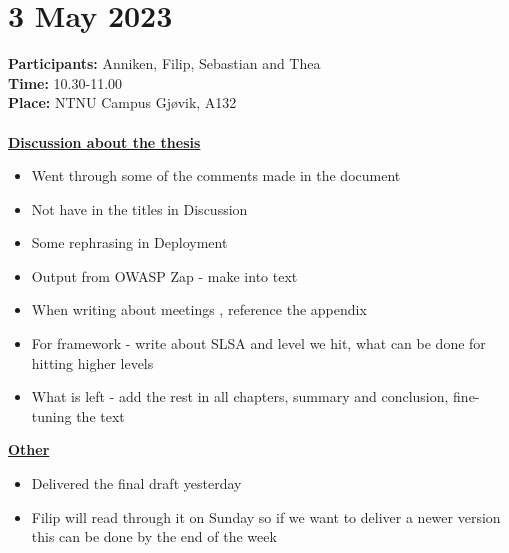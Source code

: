 \section{3 May 2023}
\textbf{Participants:} Anniken, Filip, Sebastian and Thea \\
\textbf{Time:} 10.30-11.00 \\
\textbf{Place:} NTNU Campus Gjøvik, A132
\\~\\
\textbf{\underline{Discussion about the thesis}}
\begin{itemize}
    \item Went through some of the comments made in the document
    \item Not have  in the titles in Discussion
    \item Some rephrasing in Deployment
    \item Output from OWASP Zap - make into text
    \item When writing about meetings , reference the appendix
    \item For framework - write about SLSA and level we hit, what can be done for hitting higher levels
    \item What is left - add the rest in all chapters, summary and conclusion, fine-tuning the text
\end{itemize}

\textbf{\underline{Other}}
\begin{itemize}
    \item Delivered the final draft yesterday
    \item Filip will read through it on Sunday so if we want to deliver a newer version this can be done by the end of the week
\end{itemize}